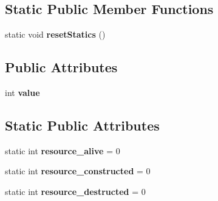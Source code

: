 \subsection*{Static Public Member Functions}
\begin{DoxyCompactItemize}
\item 
\mbox{\label{class_test_resource_imp_a0f160ff7af7919acd110bc39de818425}} 
static void {\bfseries reset\+Statics} ()
\end{DoxyCompactItemize}
\subsection*{Public Attributes}
\begin{DoxyCompactItemize}
\item 
\mbox{\label{class_test_resource_imp_a1b126982ef8895828965a6af5436620d}} 
int {\bfseries value}
\end{DoxyCompactItemize}
\subsection*{Static Public Attributes}
\begin{DoxyCompactItemize}
\item 
\mbox{\label{class_test_resource_imp_ad170455f925552b7c92e8f0c8e83eab8}} 
static int {\bfseries resource\+\_\+alive} = 0
\item 
\mbox{\label{class_test_resource_imp_a9c33d733e4acfec9023bcf17a96ad78c}} 
static int {\bfseries resource\+\_\+constructed} = 0
\item 
\mbox{\label{class_test_resource_imp_a1b9e8467763e2eac03bf5238750be4b6}} 
static int {\bfseries resource\+\_\+destructed} = 0
\end{DoxyCompactItemize}
